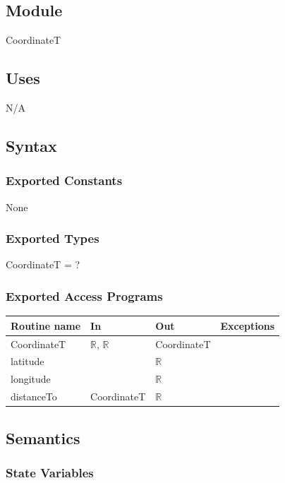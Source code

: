 \documentclass[12pt]{article}
\begin{document}
\subsection*{Module}

CoordinateT

\subsection* {Uses}

N/A

\subsection* {Syntax}

\subsubsection* {Exported Constants}

None

\subsubsection* {Exported Types}

CoordinateT = ? \\


\subsubsection* {Exported Access Programs}

\begin{tabular}{| l | l | l | l |}
\hline
\textbf{Routine name} & \textbf{In} & \textbf{Out} & \textbf{Exceptions}\\
\hline
CoordinateT & $\mathbb{R}$, $\mathbb{R}$ & CoordinateT & \\
\hline
latitude & ~ & $\mathbb{R}$ & ~\\
\hline
longitude & ~ & $\mathbb{R}$ & ~\\
\hline
distanceTo & CoordinateT & $\mathbb{R}$ & ~\\
\hline
\end{tabular}

\subsection* {Semantics}

\subsubsection* {State Variables}
\end{document}
